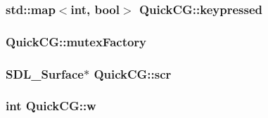 \hypertarget{namespaceQuickCG_afeaf9bfd3381e8615f172e026420afee}{
\subsubsection[{keypressed}]{\setlength{\rightskip}{0pt plus 5cm}std\-::map$<$int, bool$>$ Quick\-C\-G\-::keypressed}}\label{namespaceQuickCG_afeaf9bfd3381e8615f172e026420afee}
\hypertarget{namespaceQuickCG_aeaff2ca660279a53258f4868679c69f8}{
\subsubsection[{mutex\-Factory}]{ Quick\-C\-G\-::mutex\-Factory}}\label{namespaceQuickCG_aeaff2ca660279a53258f4868679c69f8}
\hypertarget{namespaceQuickCG_a69ab27a13de5285d506fab8d5cf51f86}{
\subsubsection[{scr}]{\setlength{\rightskip}{0pt plus 5cm}S\-D\-L\-\_\-\-Surface$\ast$ Quick\-C\-G\-::scr}}\label{namespaceQuickCG_a69ab27a13de5285d506fab8d5cf51f86}
\hypertarget{namespaceQuickCG_aee0a81fa45305d0058f5270e1acd6356}{
\subsubsection[{w}]{\setlength{\rightskip}{0pt plus 5cm}int Quick\-C\-G\-::w}}\label{namespaceQuickCG_aee0a81fa45305d0058f5270e1acd6356}
